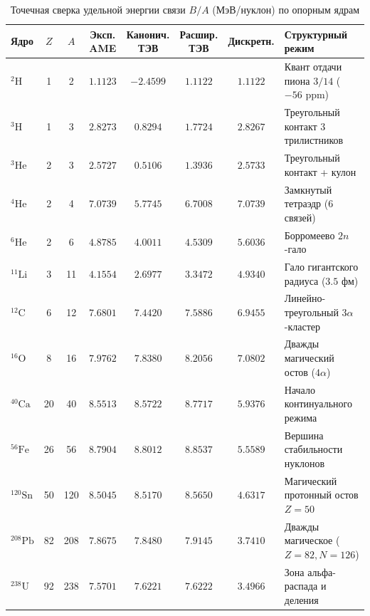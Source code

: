 \documentclass[11pt,a4paper]{article}
\theoremstyle{definition}
\theoremstyle{remark}
\begin{document}
\begin{table}[htbp]
\centering
\footnotesize
\setlength{\tabcolsep}{2.5pt}
\caption{Точечная сверка удельной энергии связи $B/A$ (МэВ/нуклон) по опорным ядрам}
\label{tab:benchmarks}
\vspace{2mm}
\begin{tabularx}{\textwidth}{l c c c c c c >{\raggedright\arraybackslash}X}
\toprule
\textbf{Ядро} & \textbf{$Z$} & \textbf{$A$} & \textbf{Эксп. AME} & \textbf{Канонич. ТЭВ} & \textbf{Расшир. ТЭВ} & \textbf{Дискретн.} & \textbf{Структурный режим} \\
\midrule
$^2\mathrm{H}$ & 1 & 2 & $1.1123$ & $-2.4599$ & $\mathbf{1.1122}$ & $1.1122$ & Квант отдачи пиона $3/14$ ($-56\text{ ppm}$) \\
$^3\mathrm{H}$ & 1 & 3 & $2.8273$ & $0.8294$ & $1.7724$ & $\mathbf{2.8267}$ & Треугольный контакт 3 трилистников \\
$^3\mathrm{He}$ & 2 & 3 & $2.5727$ & $0.5106$ & $1.3936$ & $\mathbf{2.5733}$ & Треугольный контакт + кулон \\
$^4\mathrm{He}$ & 2 & 4 & $7.0739$ & $5.7745$ & $6.7008$ & $\mathbf{7.0739}$ & Замкнутый тетраэдр (6 связей) \\
$^6\mathrm{He}$ & 2 & 6 & $4.8785$ & $4.0011$ & $\mathbf{4.5309}$ & $5.6036$ & Борромеево $2n$-гало \\
$^{11}\mathrm{Li}$ & 3 & 11 & $4.1554$ & $2.6977$ & $\mathbf{3.3472}$ & $4.9340$ & Гало гигантского радиуса ($3.5\text{ фм}$) \\
$^{12}\mathrm{C}$ & 6 & 12 & $7.6801$ & $7.4420$ & $\mathbf{7.5886}$ & $6.9455$ & Линейно-треугольный $3\alpha$-кластер \\
$^{16}\mathrm{O}$ & 8 & 16 & $7.9762$ & $\mathbf{7.8380}$ & $8.2056$ & $7.0802$ & Дважды магический остов ($4\alpha$) \\
$^{40}\mathrm{Ca}$ & 20 & 40 & $8.5513$ & $\mathbf{8.5722}$ & $8.7717$ & $5.9376$ & Начало континуального режима \\
$^{56}\mathrm{Fe}$ & 26 & 56 & $8.7904$ & $\mathbf{8.8012}$ & $8.8537$ & $5.5589$ & Вершина стабильности нуклонов \\
$^{120}\mathrm{Sn}$ & 50 & 120 & $8.5045$ & $\mathbf{8.5170}$ & $8.5650$ & $4.6317$ & Магический протонный остов $Z=50$ \\
$^{208}\mathrm{Pb}$ & 82 & 208 & $7.8675$ & $\mathbf{7.8480}$ & $7.9145$ & $3.7410$ & Дважды магическое ($Z=82, N=126$) \\
$^{238}\mathrm{U}$ & 92 & 238 & $7.5701$ & $\mathbf{7.6221}$ & $7.6222$ & $3.4966$ & Зона альфа-распада и деления \\
\bottomrule
\end{tabularx}
\end{table}
\end{document}
